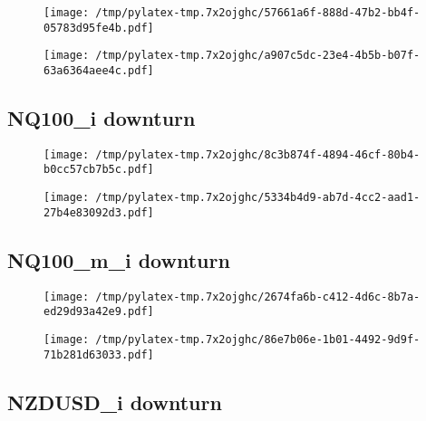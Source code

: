 \documentclass{article}%
\begin{document}
\begin{figure}[htbp]%
\centering%
\texttt{[image: /tmp/pylatex-tmp.7x2ojghc/57661a6f-888d-47b2-bb4f-05783d95fe4b.pdf]}%
\end{figure}

%


\begin{figure}[htbp]%
\centering%
\texttt{[image: /tmp/pylatex-tmp.7x2ojghc/a907c5dc-23e4-4b5b-b07f-63a6364aee4c.pdf]}%
\end{figure}

%
\newpage %
\subsection{NQ100\_i downturn}%
\label{subsec:NQ100idownturn}%


\begin{figure}[htbp]%
\centering%
\texttt{[image: /tmp/pylatex-tmp.7x2ojghc/8c3b874f-4894-46cf-80b4-b0cc57cb7b5c.pdf]}%
\end{figure}

%


\begin{figure}[htbp]%
\centering%
\texttt{[image: /tmp/pylatex-tmp.7x2ojghc/5334b4d9-ab7d-4cc2-aad1-27b4e83092d3.pdf]}%
\end{figure}

%
\newpage %
\subsection{NQ100\_m\_i downturn}%
\label{subsec:NQ100midownturn}%


\begin{figure}[htbp]%
\centering%
\texttt{[image: /tmp/pylatex-tmp.7x2ojghc/2674fa6b-c412-4d6c-8b7a-ed29d93a42e9.pdf]}%
\end{figure}

%


\begin{figure}[htbp]%
\centering%
\texttt{[image: /tmp/pylatex-tmp.7x2ojghc/86e7b06e-1b01-4492-9d9f-71b281d63033.pdf]}%
\end{figure}

%
\newpage %
\subsection{NZDUSD\_i downturn}%
\label{subsec:NZDUSDidownturn}%
\end{document}
